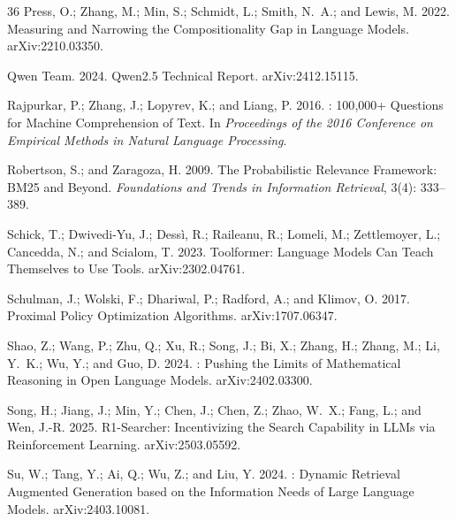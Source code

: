 \begin{thebibliography}{36}
Press, O.; Zhang, M.; Min, S.; Schmidt, L.; Smith, N.~A.; and Lewis, M. 2022.
\newblock Measuring and Narrowing the Compositionality Gap in Language Models.
\newblock arXiv:2210.03350.

{Qwen Team}. 2024.
\newblock Qwen2.5 Technical Report.
\newblock arXiv:2412.15115.

Rajpurkar, P.; Zhang, J.; Lopyrev, K.; and Liang, P. 2016.
: 100{,}000+ Questions for Machine Comprehension of Text.
\newblock In \emph{Proceedings of the 2016 Conference on Empirical Methods in Natural Language Processing}.

Robertson, S.; and Zaragoza, H. 2009.
\newblock The Probabilistic Relevance Framework: {BM25} and Beyond.
\newblock \emph{Foundations and Trends in Information Retrieval}, 3(4): 333--389.

Schick, T.; Dwivedi-Yu, J.; Dess{\`i}, R.; Raileanu, R.; Lomeli, M.; Zettlemoyer, L.; Cancedda, N.; and Scialom, T. 2023.
\newblock Toolformer: Language Models Can Teach Themselves to Use Tools.
\newblock arXiv:2302.04761.

Schulman, J.; Wolski, F.; Dhariwal, P.; Radford, A.; and Klimov, O. 2017.
\newblock Proximal Policy Optimization Algorithms.
\newblock arXiv:1707.06347.

Shao, Z.; Wang, P.; Zhu, Q.; Xu, R.; Song, J.; Bi, X.; Zhang, H.; Zhang, M.; Li, Y.~K.; Wu, Y.; and Guo, D. 2024.
: Pushing the Limits of Mathematical Reasoning in Open Language Models.
\newblock arXiv:2402.03300.

Song, H.; Jiang, J.; Min, Y.; Chen, J.; Chen, Z.; Zhao, W.~X.; Fang, L.; and Wen, J.-R. 2025.
\newblock R1-Searcher: Incentivizing the Search Capability in {LLMs} via Reinforcement Learning.
\newblock arXiv:2503.05592.

Su, W.; Tang, Y.; Ai, Q.; Wu, Z.; and Liu, Y. 2024.
: Dynamic Retrieval Augmented Generation based on the Information Needs of Large Language Models.
\newblock arXiv:2403.10081.


\end{thebibliography}
